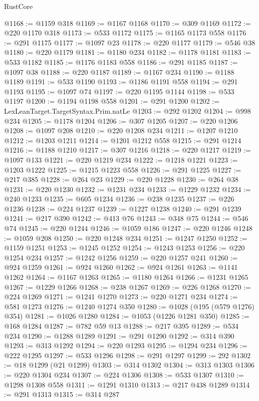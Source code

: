 \begin{lexlean}{RustCore}
\begin{coremodule}
@1168 := @1159 @318
@1169 := @1167 @1168
@1170 := @309 @1169
@1172 := @220 @1170 @318
@1173 := @533 @1172
@1175 := @1165 @1173 @558
@1176 := @291 @1175
@1177 := @1097 @23
@1178 := @220 @1177
@1179 := @546 @38
@1180 := @220 @1179
@1181 := @1180 @234
@1182 := @1178 @1181
@1183 := @533 @1182
@1185 := @1176 @1183 @558
@1186 := @291 @1185
@1187 := @1097 @38
@1188 := @220 @1187
@1189 := @1167 @234
@1190 := @1188 @1189
@1191 := @533 @1190
@1193 := @1186 @1191 @558
@1194 := @291 @1193
@1195 := @1097 @74
@1197 := @220 @1195 @1144
@1198 := @533 @1197
@1200 := @1194 @1198 @558
@1201 := @291 @1200
@1202 := LexLeanTarget.TargetSyntax.Prim.natLe
@1203 := @292 @1202
@1204 := @998 @234
@1205 := @1178 @1204
@1206 := @307 @1205
@1207 := @220 @1206
@1208 := @1097 @208
@1210 := @220 @1208 @234
@1211 := @1207 @1210
@1212 := @1203 @1211
@1214 := @1201 @1212 @558
@1215 := @291 @1214
@1216 := @1188 @1210
@1217 := @307 @1216
@1218 := @220 @1217
@1219 := @1097 @133
@1221 := @220 @1219 @234
@1222 := @1218 @1221
@1223 := @1203 @1222
@1225 := @1215 @1223 @558
@1226 := @291 @1225
@1227 := @217 @385
@1228 := @264 @23
@1229 := @220 @1228
@1230 := @264 @38
@1231 := @220 @1230
@1232 := @1231 @234
@1233 := @1229 @1232
@1234 := @240 @1233
@1235 := @605 @1234
@1236 := @238 @1235
@1237 := @226 @1236
@1238 := @224 @1237
@1239 := @1227 @1238
@1240 := @291 @1239
@1241 := @217 @390
@1242 := @413 @76
@1243 := @348 @75
@1244 := @546 @74
@1245 := @220 @1244
@1246 := @1059 @186
@1247 := @220 @1246
@1248 := @1059 @208
@1250 := @220 @1248 @234
@1251 := @1247 @1250
@1252 := @1159 @1251
@1253 := @1245 @1252
@1254 := @1243 @1253
@1256 := @220 @1254 @234
@1257 := @1242 @1256
@1259 := @220 @1257 @241
@1260 := @924 @1259
@1261 := @924 @1260
@1262 := @924 @1261
@1263 := @1141 @1262
@1264 := @1167 @1263
@1265 := @1180 @1264
@1266 := @1231 @1265
@1267 := @1229 @1266
@1268 := @238 @1267
@1269 := @226 @1268
@1270 := @224 @1269
@1271 := @1241 @1270
@1273 := @220 @1271 @234
@1274 := @581 @1273
@1276 := @1240 @1274 @350
@1280 := @1028 (@195 (@579 @1276) @354)
@1281 := @1026 @1280
@1284 := @1053 (@1226 @1281 @350)
@1285 := @168 @1284
@1287 := @782 @59 @13
@1288 := @217 @395
@1289 := @534 @234
@1290 := @1288 @1289
@1291 := @291 @1290
@1292 := @314 @390
@1293 := @313 @1292
@1294 := @220 @1293
@1295 := @1294 @234
@1296 := @222 @1295
@1297 := @533 @1296
@1298 := @291 @1297
@1299 := 292
@1302 := @18 @1299 (@21 @1299)
@1303 := @314 @1302
@1304 := @313 @1303
@1306 := @220 @1304 @234
@1307 := @224 @1306
@1308 := @533 @1307
@1310 := @1298 @1308 @558
@1311 := @1291 @1310
@1313 := @217 @438 @1289
@1314 := @291 @1313
@1315 := @314 @287

\end{coremodule}
\end{lexlean}
